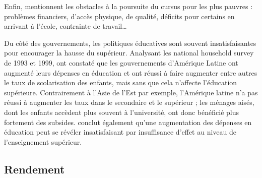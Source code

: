 \documentclass[pagesize, twoside=off, bibliography=totoc, DIV=calc, fontsize=12pt, a4paper, french]{scrartcl}
\begin{document}
Enfin, \citet{birdsall} mentionnent les obstacles à la poursuite du cursus pour les plus pauvres : problèmes financiers, d’accès physique, de qualité, déficits pour certains en arrivant à l’école, contrainte de travail…

Du côté des gouvernements, les politiques éducatives sont souvent insatisfaisantes pour encourager la hausse du supérieur. Analysant les \og{}national household survey\fg{} de 1993 et 1999, \citet{birdsall} ont constaté que les gouvernements d’Amérique Latine ont augmenté leurs dépenses en éducation et ont réussi à faire augmenter entre autres le taux de scolarisation des enfants, mais sans que cela n’affecte l’éducation supérieure. Contrairement à l’Asie de l’Est par exemple, l’Amérique latine n’a pas réussi à augmenter les taux dans le secondaire et le supérieur ; les ménages aisés, dont les enfants accèdent plus souvent à l’université, ont donc bénéficié plus fortement des subsides.  conclut également qu’une augmentation des dépenses en éducation peut se révéler insatisfaisant par insuffisance d’effet au niveau de l'enseignement supérieur.

\subsection{Rendement}

\label{sec_rendement}
\end{document}
